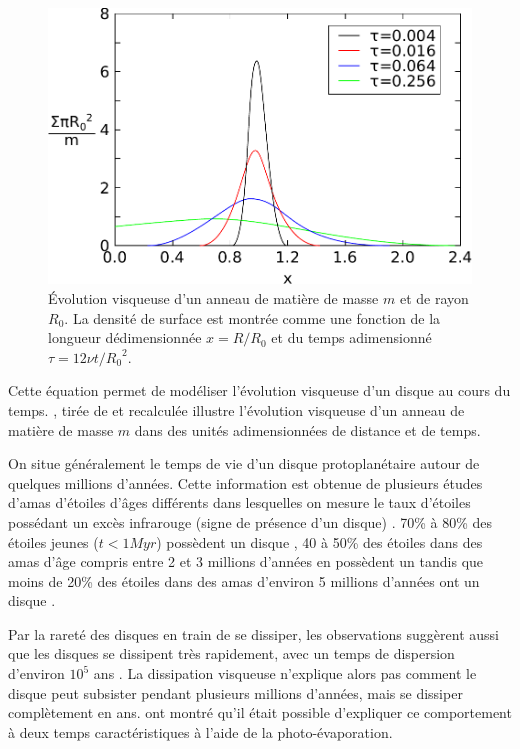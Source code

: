 \begin{figure}[htbp]
\centering
\includegraphics[width=0.65\linewidth]{figure/pringle_viscous_dissipation.pdf}
\caption[Évolution visqueuse d'un anneau de matière]{Évolution visqueuse d'un anneau de matière de masse $m$ et de rayon $R_0$.
La densité de surface est montrée comme une fonction de la longueur dédimensionnée $x=R/R_0$ et du temps adimensionné
$\tau=12\nu t / {R_0}^2$.}\label{fig:pringle_viscous_dissipation}
\end{figure}

Cette équation permet de modéliser l'évolution visqueuse d'un disque au cours du temps. , tirée de \cite{pringle1981accretion} et recalculée illustre l'évolution visqueuse d'un anneau de matière de masse $m$ dans des unités adimensionnées de distance et de temps.

\bigskip

On situe généralement le temps de vie d'un disque protoplanétaire autour de quelques millions d'années. Cette information est
obtenue de plusieurs études d'amas d'étoiles d'âges différents dans lesquelles on mesure le taux d'étoiles possédant un excès
infrarouge (signe de présence d'un disque) \citep{williams2011protoplanetary}. 70\% à 80\% des étoiles jeunes ($t<1\unit{Myr}$)
possèdent un disque \citep{winston2007combined, gutermuth2008spitzer}, 40 à 50\% des étoiles dans des amas d'âge compris entre 2
et 3 millions d'années en possèdent un \citep{lada2006spitzer, sung2009spitzer} tandis que moins de 20\% des étoiles dans des
amas d'environ 5 millions d'années ont un disque \citep{currie2009last}. 

Par la rareté des disques en train de se dissiper, les observations suggèrent aussi que les disques se dissipent très rapidement, avec un temps de dispersion d'environ $10^5$ ans \citep{simon1995disk, wolk1996search}. La dissipation visqueuse n'explique alors pas comment le disque peut subsister pendant plusieurs millions d'années, mais se dissiper complètement en  ans. \cite{clarke2001dispersal} ont montré qu'il était possible d'expliquer ce comportement à deux temps caractéristiques à l'aide de la photo-évaporation. 

